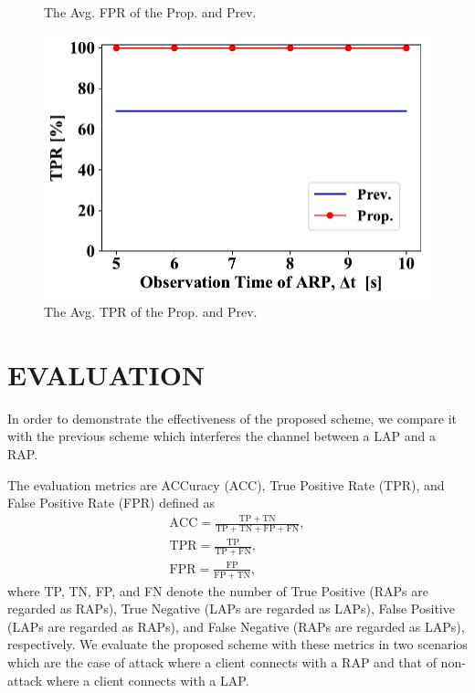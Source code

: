\documentclass[conference]{IEEEtran}
\begin{document}
\begin{figure}[ht]
\begin{minipage}{0.33\hsize}
\begin{center}
        \end{center}
        \caption{The Avg. FPR of the Prop. and Prev.}
        \label{fig:fpr}
    \end{minipage}
    \begin{minipage}{0.33\hsize}
        \begin{center}
            \includegraphics[scale=0.34]{figure/TPR.pdf}
        \end{center}
        \caption{The Avg. TPR of the Prop. and Prev.}
        \label{fig:tpr}
    \end{minipage}
\vspace{-1zh}
\end{figure}
\section{EVALUATION}\label{sec:5}
In order to demonstrate the effectiveness of the proposed scheme, we compare it with the previous scheme \cite{previous} which interferes the channel between a LAP and a RAP.

The evaluation metrics are ACCuracy (ACC), True Positive Rate (TPR), and False Positive Rate (FPR) defined as
\begin{gather}
    \mathrm{ACC} = \frac{\mathrm{TP} + \mathrm{TN}}{\mathrm{TP} + \mathrm{TN} + \mathrm{FP} + \mathrm{FN}},\\
    \mathrm{TPR} = \frac{\mathrm{TP}}{\mathrm{TP} + \mathrm{FN}},\\
    \mathrm{FPR} = \frac{\mathrm{FP}}{\mathrm{FP} + \mathrm{TN}},
\end{gather}
where TP, TN, FP, and FN denote the number of True Positive (RAPs are regarded as RAPs), True Negative (LAPs are regarded as LAPs), False Positive (LAPs are regarded as RAPs), and False Negative (RAPs are regarded as LAPs), respectively.
We evaluate the proposed scheme with these metrics in two scenarios which are the case of attack where a client connects with a RAP and that of non-attack where a client connects with a LAP.
\end{document}
